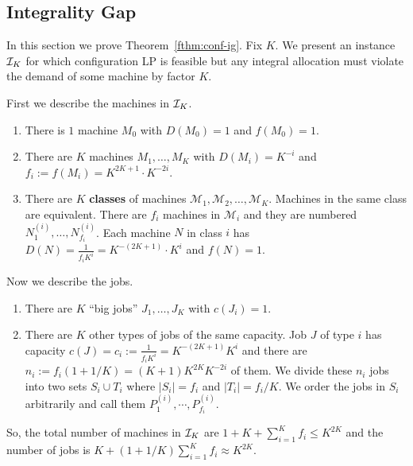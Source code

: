 \subsection{Integrality Gap}\label{fsec:conf-ig}
In this section we prove Theorem~\ref{fthm:conf-ig}.
	\def\M{\mathcal{M}}
	Fix $K$. We present an instance ${\cal I}_K$ for which configuration LP is feasible but any integral allocation must violate the demand of some machine by factor $K$.
	
	First we describe the machines in ${\cal I}_K$.
	\begin{enumerate}
		\item There is $1$ machine $M_0$ with $D(M_0) = 1$ and $f(M_0) = 1$.
		\item There are $K$ machines $M_1,\ldots,M_K$ with $D(M_i) = K^{-i}$ and $f_i := f(M_i) = K^{2K + 1}\cdot K^{-2i}$.
		\item There are $K$ {\bf classes} of machines $\M_1,\M _2,\ldots, \M _K$. Machines in the same class are equivalent.
		There are $f_i$ machines in $\M_i$ and they are numbered $N^{(i)}_1,\ldots,N^{(i)}_{f_i}$.
		Each machine $N$  in class $i$ has $D(N) = \frac{1}{f_iK^i} = K^{-(2K+ 1)}\cdot K^i$ and $f(N) = 1$.
	\end{enumerate}
	Now we describe the jobs.
	\begin{enumerate}
		\item There are $K$ ``big jobs'' $J_1,\ldots,J_K$ with $c(J_i) = 1$.
		\item There are $K$ other types of jobs of the same capacity. Job $J$ of type $i$ has capacity $c(J) = c_i :=  \frac{1}{f_iK^i} = K^{-(2K+1)}K^i$  and there are $n_i := f_i (1+1/K) = (K+1)K^{2K}K^{-2i}$ of them.
		We divide these $n_i$ jobs into two sets $S_i \cup T_i$ where $|S_i| = f_i$ and $|T_i| = f_i/K$. We order the jobs in $S_i$ arbitrarily and call them $P^{(i)}_1,\cdots,P^{(i)}_{f_i}$.
	\end{enumerate}
	So, the total number of machines in ${\cal I}_K$ are $1 + K + \sum_{i=1}^K f_i  \leq K^{2K}$ and the number of jobs is $K + (1+1/K)\sum_{i=1}^K f_i \approx K^{2K}$.
	
